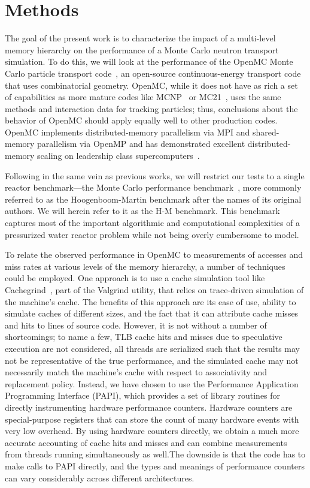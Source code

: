 \documentclass{mc2015}
\begin{document}
\section{Methods}

The goal of the present work is to characterize the impact of a multi-level
memory hierarchy on the performance of a Monte Carlo neutron transport
simulation. To do this, we will look at the performance of the OpenMC Monte
Carlo particle transport code~\cite{ane-romano-2013, ane-romano-2014}, an
open-source continuous-energy transport code that uses combinatorial
geometry. OpenMC, while it does not have as rich a set of capabilities as more
mature codes like MCNP~\cite{lanl-goorley-2014} or
MC21~\cite{ane-griesheimer-2014}, uses the same methods and interaction data for
tracking particles; thus, conclusions about the behavior of OpenMC should apply
equally well to other production codes. OpenMC implements distributed-memory
parallelism via MPI and shared-memory parallelism via OpenMP and has
demonstrated excellent distributed-memory scaling on leadership class
supercomputers~\cite{ane-romano-2013}.

Following in the same vein as previous works, we will restrict our tests to a
single reactor benchmark---the Monte Carlo performance
benchmark~\cite{mc-hoogenboom-2011}, more commonly referred to as the
Hoogenboom-Martin benchmark after the names of its original authors. We will
herein refer to it as the H-M benchmark. This benchmark captures most of the
important algorithmic and computational complexities of a pressurized water
reactor problem while not being overly cumbersome to model.

To relate the observed performance in OpenMC to measurements of accesses and
miss rates at various levels of the memory hierarchy, a number of techniques
could be employed. One approach is to use a cache simulation tool like
Cachegrind~\cite{cachegrind}, part of the Valgrind utility, that relies on
trace-driven simulation of the machine's cache. The benefits of this approach
are its ease of use, ability to simulate caches of different sizes, and the fact
that it can attribute cache misses and hits to lines of source code. However, it
is not without a number of shortcomings; to name a few, TLB cache hits and
misses due to speculative execution are not considered, all threads are
serialized such that the results may not be representative of the true
performance, and the simulated cache may not necessarily match the machine's
cache with respect to associativity and replacement policy. Instead, we have
chosen to use the Performance Application Programming Interface (PAPI), which
provides a set of library routines for directly instrumenting hardware
performance counters. Hardware counters are special-purpose registers that can
store the count of many hardware events with very low overhead. By using
hardware counters directly, we obtain a much more accurate accounting of cache
hits and misses and can combine measurements from threads running simultaneously
as well.The downside is that the code has to make calls to PAPI directly, and
the types and meanings of performance counters can vary considerably across
different architectures.
\end{document}
